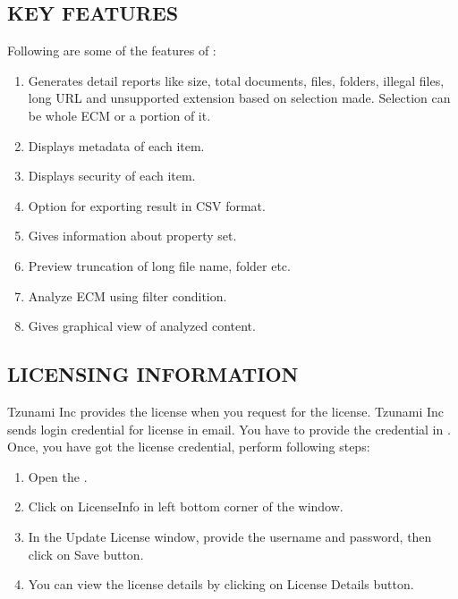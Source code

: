 \subsection{KEY FEATURES}
Following are some of the features of \appName:
\\
\begin{enumerate}
  \item Generates detail reports like size, total documents, files, folders, illegal files, long URL and unsupported extension based on selection made. Selection can be whole ECM or a portion of it.
  \item Displays metadata of each item.
  \item Displays security of each item.
  \item Option for exporting result in CSV format.
  \item Gives information about property set.
  \item Preview truncation of long file name, folder etc.
  \item Analyze ECM using filter condition.
  \item Gives graphical view of analyzed content.
\end{enumerate}
\subsection{LICENSING INFORMATION}
Tzunami Inc provides the license when you request for the license. Tzunami Inc sends login credential for license in email. You have to provide the credential in \appName. Once, you have got the license credential, perform following steps:
\\
\begin{enumerate}
\item	Open the \appName.
\item	Click on LicenseInfo in left bottom corner of the window.
\item	In the Update License window, provide the username and password, then click on Save button.
\item	You can view the license details by clicking on License Details button.
\end{enumerate}



